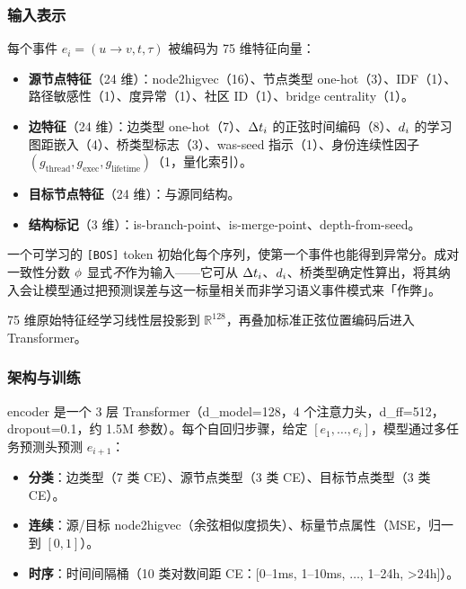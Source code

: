 \subsubsection{输入表示}

每个事件 $e_i = (u \rightarrow v, t, \tau)$ 被编码为 75 维特征向量：

\begin{itemize}
\item \textbf{源节点特征}（24 维）：node2higvec（16）、节点类型 one-hot（3）、IDF（1）、路径敏感性（1）、度异常（1）、社区 ID（1）、bridge centrality（1）。
\item \textbf{边特征}（24 维）：边类型 one-hot（7）、$\Delta t_i$ 的正弦时间编码（8）、$d_i$ 的学习图距嵌入（4）、桥类型标志（3）、was-seed 指示（1）、身份连续性因子 $(g_{\text{thread}}, g_{\text{exec}}, g_{\text{lifetime}})$（1，量化索引）。
\item \textbf{目标节点特征}（24 维）：与源同结构。
\item \textbf{结构标记}（3 维）：is-branch-point、is-merge-point、depth-from-seed。
\end{itemize}

一个可学习的 \texttt{[BOS]} token 初始化每个序列，使第一个事件也能得到异常分。成对一致性分数 $\phi$ 显式\emph{不}作为输入——它可从 $\Delta t_i$、$d_i$、桥类型确定性算出，将其纳入会让模型通过把预测误差与这一标量相关而非学习语义事件模式来「作弊」。

75 维原始特征经学习线性层投影到 $\mathbb{R}^{128}$，再叠加标准正弦位置编码后进入 Transformer。

\subsubsection{架构与训练}

encoder 是一个 3 层 Transformer（d\_model=128，4 个注意力头，d\_ff=512，dropout=0.1，约 1.5M 参数）。每个自回归步骤，给定 $[e_1, \dots, e_i]$，模型通过多任务预测头预测 $e_{i+1}$：

\begin{itemize}
\item \textbf{分类}：边类型（7 类 CE）、源节点类型（3 类 CE）、目标节点类型（3 类 CE）。
\item \textbf{连续}：源/目标 node2higvec（余弦相似度损失）、标量节点属性（MSE，归一到 $[0,1]$）。
\item \textbf{时序}：时间间隔桶（10 类对数间距 CE：[0--1ms, 1--10ms, $\dots$, 1--24h, >24h]）。
\end{itemize}

